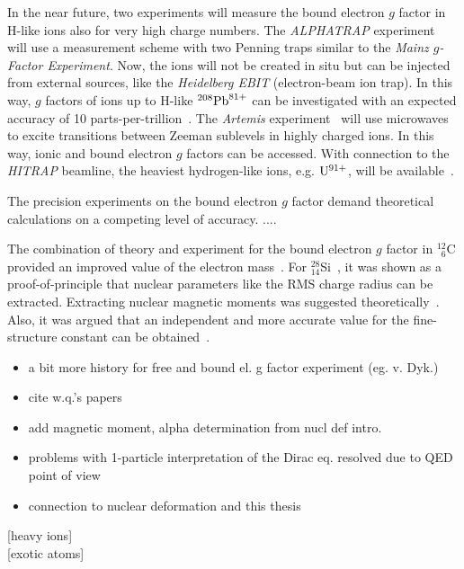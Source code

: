 In the near future, two experiments will measure the bound electron $g$ factor in H-like ions also for very high charge numbers. The \textit{ALPHATRAP} experiment~\cite{sturm2017} will use a measurement scheme with two Penning traps similar to the \textit{Mainz $g$-Factor Experiment}. Now, the ions will not be created in situ but can be injected from external sources, like the \textit{Heidelberg EBIT} (electron-beam ion trap). In this way, $g$ factors of ions up to H-like $^{208}\rm{Pb}^{81+}$ can be investigated with an expected accuracy of 10 parts-per-trillion~\cite{sturm2017}. The \textit{Artemis} experiment~\cite{vogel2013,sturm2017} will use microwaves to excite transitions between Zeeman sublevels in highly charged ions. In this way, ionic and bound electron $g$ factors can be accessed. With connection to the \textit{HITRAP} beamline, the heaviest hydrogen-like ions, e.g. $\rm{U}^{91+}$, will be available~\cite{vogel2015}.

The precision experiments on the bound electron $g$ factor demand theoretical calculations on a competing level of accuracy. ....

The combination of theory and experiment for the bound electron $g$ factor in $^{12}_{\phantom{0}6}$C provided an improved value of the electron mass~\cite{Sturm2014}. For $^{28}_{14}$Si~\cite{Sturm2011}, it was shown as a proof-of-principle that nuclear parameters like the RMS charge radius can be extracted. Extracting nuclear magnetic moments was suggested theoretically~\cite{Yerokhin2011,Werth2001}. Also, it was argued that an independent and more accurate value for the fine-structure constant can be obtained~\cite{Shabaev2006,yerokhin2016}.

\begin{itemize}
\item a bit more history for free and bound el. g factor experiment (eg. v. Dyk.)
\item cite w.q.'s papers
\item add magnetic moment, alpha determination from nucl def intro.
\item problems with 1-particle interpretation of the Dirac eq. resolved due to QED point of view
\item connection to nuclear deformation and this thesis
\end{itemize}
[heavy ions]\\[11pt]
[exotic atoms]\\[11pt]




















